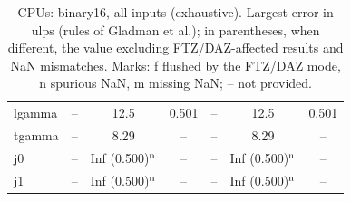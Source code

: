 \begin{table}
\begin{small}
\begin{tabular}{|l|ccc|ccc|}
lgamma & -- & 12.5 & 0.501 & -- & 12.5 & 0.501 \\
tgamma & -- & 8.29 & -- & -- & 8.29 & -- \\
j0 & -- & Inf (0.500)$^{\rm n}$ & -- & -- & Inf (0.500)$^{\rm n}$ & -- \\
j1 & -- & Inf (0.500)$^{\rm n}$ & -- & -- & Inf (0.500)$^{\rm n}$ & -- \\
\hline
\end{tabular}
\end{small}
\caption{CPUs: binary16, all inputs (exhaustive). Largest error in ulps (rules of Gladman et al.); in parentheses, when different, the value excluding FTZ/DAZ-affected results and NaN mismatches. Marks: f flushed by the FTZ/DAZ mode, n spurious NaN, m missing NaN; -- not provided.}
\label{tab:b16cpu}
\end{table}
